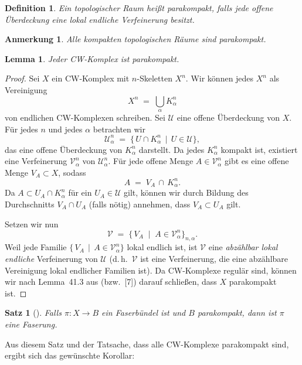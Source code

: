 \documentclass[12pt, hidelinks]{article}
\numberwithin{conj}{section}
\newtheorem{definition}[conj]{Definition}
\newtheorem{remark}[conj]{Anmerkung}
\newtheorem{theorem}[conj]{Satz}
\newtheorem{lemma}[conj]{Lemma}
\begin{document}
\begin{definition}
    Ein topologischer Raum heißt \emph{parakompakt}, falls jede offene Überdeckung eine lokal endliche Verfeinerung besitzt.
\end{definition}

\begin{remark}
    Alle kompakten topologischen Räume sind parakompakt.
\end{remark}

\begin{lemma}
    Jeder \emph{CW-Komplex} ist parakompakt.
\end{lemma}

\begin{proof}
Sei $X$ ein CW-Komplex mit $n$-Skeletten $X^n$. Wir können jedes $X^n$ als Vereinigung 
\[
    X^n \;=\; \bigcup_{\alpha} K^n_{\alpha}
\]
von endlichen CW-Komplexen schreiben. Sei $\mathcal{U}$ eine offene Überdeckung von $X$. Für jedes $n$ und jedes $\alpha$ betrachten wir
\[
    \mathcal{U}^n_\alpha \;=\; \{\,U \cap K^n_{\alpha} \,\mid\, U \in \mathcal{U}\},
\]
das eine offene Überdeckung von $K^n_{\alpha}$ darstellt. Da jedes $K^n_{\alpha}$ kompakt ist, existiert eine Verfeinerung $\mathcal{V}^n_\alpha$ von $\mathcal{U}^n_\alpha$. Für jede offene Menge $A \in \mathcal{V}^n_\alpha$ gibt es eine offene Menge $V_A \subset X$, sodass
\[
    A \;=\; V_A \,\cap\, K^n_{\alpha}.
\]
Da $A \subset U_A \cap K^n_{\alpha}$ für ein $U_A \in \mathcal{U}$ gilt, können wir durch Bildung des Durchschnitts $V_A \cap U_A$ (falls nötig) annehmen, dass $V_A \subset U_A$ gilt.

Setzen wir nun
\[
    \mathcal{V} \;=\; \bigl\{\,V_A \;\mid\; A \in \mathcal{V}^n_{\alpha}\bigr\}_{n,\alpha}.
\]
Weil jede Familie $\{\,V_A \,\mid\, A \in \mathcal{V}^n_{\alpha}\}$ lokal endlich ist, ist $\mathcal{V}$ eine \emph{abzählbar lokal endliche} Verfeinerung von $\mathcal{U}$ (d.\,h.\ $\mathcal{V}$ ist eine Verfeinerung, die eine abzählbare Vereinigung lokal endlicher Familien ist). Da CW-Komplexe regulär sind, können wir nach Lemma~41.3 aus \cite{hatcher2001} (bzw.\ [7]) darauf schließen, dass $X$ parakompakt ist.
\end{proof}

\begin{theorem}[{\cite[Theorem 1]{huebsch1955}}]
    Falls \(\pi : X \to B\) ein Faserbündel ist und \(B\) parakompakt, dann ist \(\pi\) eine Faserung.
\end{theorem}

\noindent
Aus diesem Satz und der Tatsache, dass alle CW-Komplexe parakompakt sind, ergibt sich das gewünschte Korollar:
\end{document}
